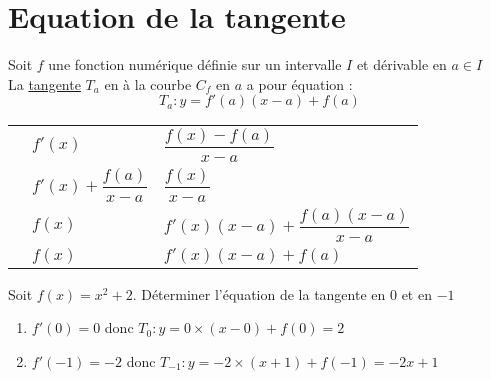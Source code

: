 \documentclass[12pt]{article}
\begin{document}
\section{Equation de la tangente} %

\begin{propriete}
   Soit $f$ une fonction numérique définie sur un intervalle $I$ et dérivable en $a\in I$\\
La \underline{tangente} $T_a$ en à la courbe $C_f$ en $a$ a pour équation :
$$T_a : y=f'(a)(x-a)+f(a)$$
\end{propriete}

\begin{demonstration}
\begin{center}
  \begin{tabular}{p{0.3cm}l!{=}l}
    &  $f'(x)$ & $\dfrac{f(x)-f(a)}{x-a}$ \\
    & $f'(x)+\dfrac{f(a)}{x-a}$& $\dfrac{f(x)}{x-a}$ \\
    &   $f(x)$ & $f'(x)(x-a)+\dfrac{f(a)(x-a)}{x-a}$ \\
    &   $f(x)$ & $f'(x)(x-a)+f(a)$ \\
  \end{tabular}
\end{center}
\end{demonstration}

\begin{exemple}
   Soit $f(x)=x^2+2$. Déterminer l'équation de la tangente en $0$ et en $-1$
   \begin{enumerate}
      \item $f'(0)=0$ donc $T_0 : y=0\times(x-0)+f(0)=2$
      \item $f'(-1)=-2$ donc $T_{-1} : y=-2\times(x+1)+f(-1)=-2x+1$
   \end{enumerate}
\end{exemple}
\end{document}
